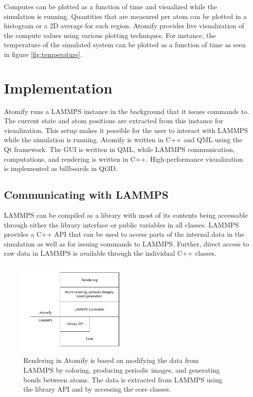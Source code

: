 \documentclass[aps,pre,twocolumn,letterpaper,floatfix,nofootinbib]{revtex4}
\begin{document}
Computes can be plotted as a function of time and visualized while the 
simulation is running.
Quantities that are measured per atom can be plotted in a histogram or a 2D
average for each region.
Atomify provides live visualization of the compute values using various plotting
techniques.
For instance, the temperature of the simulated system can be plotted as a
function of time as seen in figure \ref{fig:temperature}.


\section{Implementation}

Atomify runs a LAMMPS instance in the background that it issues commands to.
The current state and atom positions are extracted from this instance for
visualization.
This setup makes it possible for the user to interact with LAMMPS while the
simulation is running.
Atomify is written in C++ and QML using the Qt framework.
The GUI is written in QML, while LAMMPS communication,
computations, and rendering is written in C++.
High-performance visualization is implemented as billboards in Qt3D.

\subsection{Communicating with LAMMPS}

LAMMPS can be compiled as a library with most of its contents being accessable
through either the library interface or public variables in all classes.
LAMMPS provides a C++ API that can be used to access parts of the internal data
in the simulation as well as for issuing commands to LAMMPS.
Further, direct access to raw data in LAMMPS is available through the individual
C++ classes.

\begin{figure}
	\centering
	\includegraphics[width=0.5\textwidth]{figures/data-pipeline.pdf}
	\caption{Rendering in Atomify is based on modifying the data from LAMMPS
    by coloring, producing periodic images, and generating bonds between atoms.
    The data is extracted from LAMMPS using the library API and by accessing
    the core classes.}
	\label{fig:data-pipeline}
\end{figure}
\end{document}
